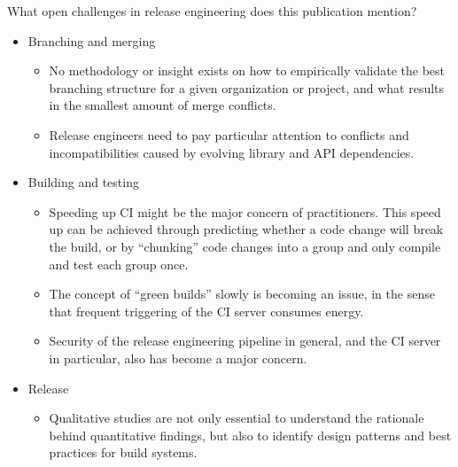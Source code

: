 \documentclass[]{book}
\providecommand{\tightlist}{%
  \setlength{\itemsep}{0pt}\setlength{\parskip}{0pt}}
\begin{document}
What open challenges in release engineering does this publication
mention?

\begin{itemize}
\tightlist
\item
  Branching and merging

  \begin{itemize}
  \tightlist
  \item
    No methodology or insight exists on how to empirically validate the
    best branching structure for a given organization or project, and
    what results in the smallest amount of merge conflicts.
  \item
    Release engineers need to pay particular attention to conflicts and
    incompatibilities caused by evolving library and API dependencies.
  \end{itemize}
\item
  Building and testing

  \begin{itemize}
  \tightlist
  \item
    Speeding up CI might be the major concern of practitioners. This
    speed up can be achieved through predicting whether a code change
    will break the build, or by ``chunking'' code changes into a group
    and only compile and test each group once.
  \item
    The concept of ``green builds'' slowly is becoming an issue, in the
    sense that frequent triggering of the CI server consumes energy.
  \item
    Security of the release engineering pipeline in general, and the CI
    server in particular, also has become a major concern.
  \end{itemize}
\item
  Release

  \begin{itemize}
  \tightlist
  \item
    Qualitative studies are not only essential to understand the
    rationale behind quantitative findings, but also to identify design
    patterns and best practices for build systems.


\end{itemize}
\end{itemize}
\end{document}
